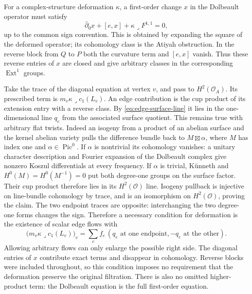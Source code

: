 For a complex-structure deformation $\kappa$, a first-order change
$x$ in the Dolbeault operator must satisfy
\begin{equation}
 \bar\partial_0x+[e,x]+\kappa\lrcorner F^{1,1}=0,
 \label{eq:tree-atiyah}
\end{equation}
up to the common sign convention.  This is obtained by expanding
the square of the deformed operator; its cohomology class is the
Atiyah obstruction.  In the reverse block from $Q$ to $P$ both the
curvature term and $[e,x]$ vanish.  Thus these reverse entries of
$x$ are closed and give arbitrary classes in the corresponding
$\operatorname{Ext}^1$ groups.

Take the trace of the diagonal equation at vertex $v$, and pass
to $H^2(\mathcal O_A)$.  Its prescribed term is
$m_v\kappa\lrcorner c_1(L_v)$.
An edge contribution is the cup product of its extension entry
with a reverse class.  By \eqref{eq:edge-surface-line} it lies in
the one-dimensional line $q_e$ from the associated surface quotient.
This remains true with arbitrary flat twists.  Indeed an isogeny
from a product of an abelian surface and the kernel abelian variety
pulls the difference bundle back to $M\boxtimes\alpha$, where
$M$ has index one and $\alpha\in\operatorname{Pic}^0$.
If $\alpha$ is nontrivial its cohomology vanishes: a unitary
character description and Fourier expansion of the Dolbeault
complex give nonzero Koszul differentials at every frequency.
If $\alpha$ is trivial, K\"unneth and $H^0(M)=H^0(M^{-1})=0$
put both degree-one groups on the surface factor.  Their cup
product therefore lies in its $H^2(\mathcal O)$ line.
Isogeny pullback is injective on line-bundle cohomology by trace,
and is an isomorphism on $H^2(\mathcal O)$, proving the claim.
The two endpoint traces are opposite: interchanging the two
degree-one forms changes the sign.
Therefore a necessary condition for deformation is the existence
of scalar edge flows with
\begin{equation}
 \bigl(m_v\kappa\lrcorner c_1(L_v)\bigr)_v
  =\sum_e f_e\,(q_e\text{ at one endpoint},
                         -q_e\text{ at the other}).
 \label{eq:tree-incidence}
\end{equation}
Allowing arbitrary flows can only enlarge the possible right side.
The diagonal entries of $x$ contribute exact terms and disappear
in cohomology.  Reverse blocks were included throughout, so this
condition imposes no requirement that the deformation preserve
the original filtration.  There is also no omitted higher-product
term: the Dolbeault equation is the full first-order equation.

